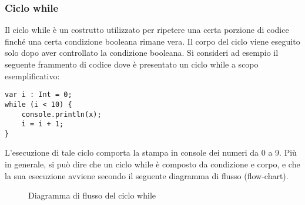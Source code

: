 \subsubsection{Ciclo while}
Il ciclo while è un costrutto utilizzato per ripetere una certa porzione di codice finché una certa condizione booleana rimane vera. Il corpo del ciclo viene eseguito solo 
dopo aver controllato la condizione booleana. Si consideri ad esempio il seguente frammento di codice dove è presentato un ciclo while a scopo esemplificativo:

\vspace{0.5cm}

\begin{lstlisting}[frame=single]
var i : Int = 0;
while (i < 10) {
    console.println(x);
    i = i + 1;
}
\end{lstlisting}

\vspace{0.5cm}

L’esecuzione di tale ciclo comporta la stampa in console dei numeri da 0 a 9. Più in generale, si può dire che un ciclo while è composto da condizione e 
corpo, e che la sua esecuzione avviene secondo il seguente diagramma di flusso (flow-chart). \\

\vspace{0.5cm}
\begin{figure}[h]
    \centering
    \caption{Diagramma di flusso del ciclo while}
    \label{fig:flowchart_while_loop}
\end{figure}